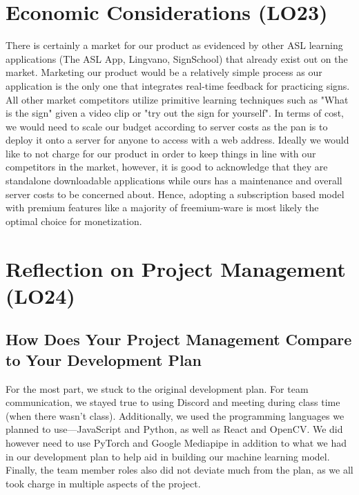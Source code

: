 \documentclass{article}
\begin{document}
\section{Economic Considerations (LO23)}


There is certainly a market for our product as evidenced by other ASL learning applications (The ASL App, Lingvano, SignSchool) that already exist out on the market. Marketing our product would be a relatively simple process as our application is the only one that integrates real-time feedback for practicing signs. All other market competitors utilize primitive learning techniques such as "What is the sign" given a video clip or "try out the sign for yourself". In terms of cost, we would need to scale our budget according to server costs as the pan is to deploy it onto a server for anyone to access with a web address. Ideally we would like to not charge for our product in order to keep things in line with our competitors in the market, however, it is good to acknowledge that they are standalone downloadable applications while ours has a maintenance and overall server costs to be concerned about. Hence, adopting a subscription based model with premium features like a majority of freemium-ware is most likely the optimal choice for monetization.

\section{Reflection on Project Management (LO24)}

\subsection{How Does Your Project Management Compare to Your Development Plan}

For the most part, we stuck to the original development plan. For team communication, we stayed true to using Discord and meeting during class time (when there wasn't class). Additionally, we used the programming languages we planned to use---JavaScript and Python, as well as React and OpenCV. We did however need to use PyTorch and Google Mediapipe in addition to what we had in our development plan to help aid in building our machine learning model. Finally, the team member roles also did not deviate much from the plan, as we all took charge in multiple aspects of the project.
\end{document}
